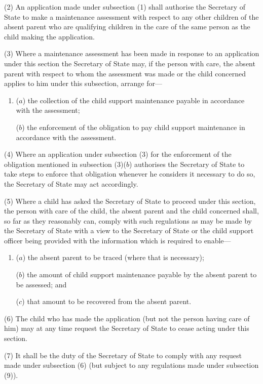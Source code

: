 \documentclass[12pt,a4paper]{article}
\begin{document}
(2) An application made under subsection (1)  shall authorise the Secretary of State to make a maintenance assessment with respect to any other children of the absent parent who are qualifying children in the care of the same person as the child making the application.

(3) Where a maintenance assessment has been made in response to an application under this section the Secretary of State may, if the person with care, the absent parent with respect to whom the assessment was made or the child concerned applies to him under this subsection, arrange for—
\begin{enumerate}\item[]
($a$) the collection of the child support maintenance payable in accordance with the assessment;

($b$) the enforcement of the obligation to pay child support maintenance in accordance with the assessment.
\end{enumerate}

(4) Where an application under subsection (3)  for the enforcement of the obligation mentioned in subsection (3)($b$)  authorises the Secretary of State to take steps to enforce that obligation whenever he considers it necessary to do so, the Secretary of State may act accordingly.

(5) Where a child has asked the Secretary of State to proceed under this section, the person with care of the child, the absent parent and the child concerned shall, so far as they reasonably can, comply with such regulations as may be made by the Secretary of State with a view to the Secretary of State 
or the child support officer  %
being provided with the information which is required to enable—
\begin{enumerate}\item[]
($a$) the absent parent to be traced (where that is necessary);

($b$) the amount of child support maintenance payable by the absent parent to be assessed; and

($c$) that amount to be recovered from the absent parent.
\end{enumerate}

(6) The child who has made the application (but not the person having care of him) may at any time request the Secretary of State to cease acting under this section.

(7) It shall be the duty of the Secretary of State to comply with any request made under subsection (6)  (but subject to any regulations made under subsection (9)).
\end{document}
